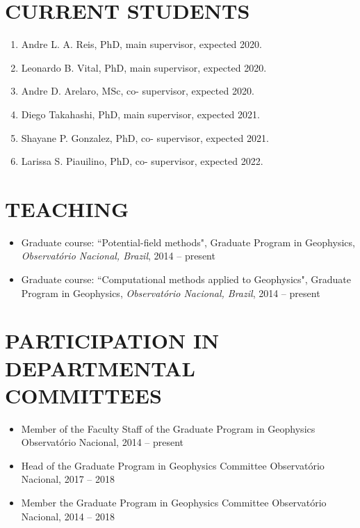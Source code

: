 \documentclass[paper=letter,fontsize=11pt]{scrartcl} %
\newcommand{\sepspace}{\vspace*{1em}}		%
\newcommand{\NewPart}[2]{\section*{\uppercase{#1} #2}}
\newcommand{\Student}[4]{
		\noindent #1, #2, #3 supervisor, expected #4.}
\newcommand{\CourseEntry}[5]{
		\noindent #1 course: ``#2", #3, \textit{#4}, #5}
\begin{document}
\sepspace

\NewPart{Current students}{}

\begin{enumerate}

\item\Student{Andre L. A. Reis}{PhD}{main}{2020}

\item\Student{Leonardo B. Vital}{PhD}{main}{2020}

\item\Student{Andre D. Arelaro}{MSc}{co-}{2020}

\item\Student{Diego Takahashi}{PhD}{main}{2021}

\item\Student{Shayane P. Gonzalez}{PhD}{co-}{2021}

\item\Student{Larissa S. Piauilino}{PhD}{co-}{2022}

\end{enumerate}

\sepspace

\NewPart{Teaching}{}

\begin{itemize}

\item\CourseEntry{Graduate}{Potential-field methods}{Graduate Program in Geophysics}{Observat\'{o}rio Nacional, Brazil}{2014 -- present}

\item\CourseEntry{Graduate}{Computational methods applied to Geophysics}{Graduate Program in Geophysics}{Observat\'{o}rio Nacional, Brazil}{2014 -- present}

\end{itemize}

\sepspace

\NewPart{Participation in departmental committees}{}

\begin{itemize}

\item Member of the Faculty Staff of the Graduate Program in Geophysics \newline
Observat\'{o}rio Nacional, 2014 -- present

\item Head of the Graduate Program in Geophysics Committee \newline
Observat\'{o}rio Nacional, 2017 -- 2018

\item Member the Graduate Program in Geophysics Committee \newline
Observat\'{o}rio Nacional, 2014 -- 2018

\end{itemize}
\end{document}
